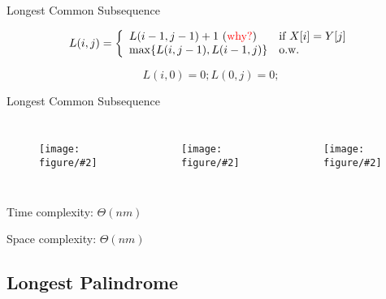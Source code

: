 \documentclass{beamer}
\newcommand{\fig}[2]
{
  \begin{figure}[htp]
	  \centering
	  \texttt{[image: figure/\#2]}
  \end{figure}
}
\begin{document}
\begin{frame}{Longest Common Subsequence}
  \begin{theorem}[Recurrence]
    \begin{displaymath}
      L(i,j) = \left\{
        \begin{array}{ll}
      	  L(i-1, j-1) + 1 \textrm{ (\textcolor{red}{why?})} & \textrm{if } X[i] =
      	  Y[j]
      	  \\
      	  \max \{ L(i,j-1), L(i-1,j) \} & \textrm{o.w.}  
        \end{array}
      \right.
    \end{displaymath}
    
    \vspace{0.50cm}
    \[
      L(i,0) = 0; L(0,j) = 0;
    \]  
  \end{theorem}
\end{frame}
\begin{frame}{Longest Common Subsequence}
  \begin{columns}
      \fig{width = 0.80\textwidth}{EDorder}
      \fig{width = 0.80\textwidth}{row-major}
      \fig{width = 0.80\textwidth}{col-major}
  \end{columns}
  
  \vspace{0.80cm}
  Time complexity: $\Theta(nm)$
  
  Space complexity: $\Theta(nm)$
\end{frame}
\subsection{Longest Palindrome}
\end{document}
